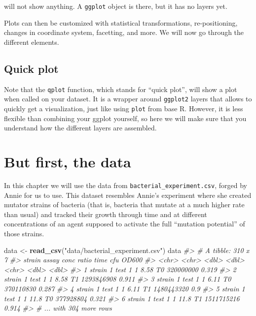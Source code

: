 \documentclass[]{book}
\newenvironment{Shaded}{}{}
\newcommand{\CommentTok}[1]{\textcolor[rgb]{0.38,0.63,0.69}{\textit{#1}}}
\newcommand{\KeywordTok}[1]{\textcolor[rgb]{0.00,0.44,0.13}{\textbf{#1}}}
\newcommand{\NormalTok}[1]{#1}
\newcommand{\StringTok}[1]{\textcolor[rgb]{0.25,0.44,0.63}{#1}}
\begin{document}
will not show anything. A \texttt{ggplot} object is there, but it has no layers yet.

Plots can then be customized with statistical transformations, re-positioning, changes in coordinate system, facetting, and more. We will now go through the different elements.

\hypertarget{quick-plot}{%
\subsection{Quick plot}\label{quick-plot}}

Note that the \texttt{qplot} function, which stands for ``quick plot'', will show a plot when called on your dataset. It is a wrapper around \texttt{ggplot2} layers that allows to quickly get a visualization, just like using \texttt{plot} from base R. However, it is less flexible than combining your ggplot yourself, so here we will make sure that you understand how the different layers are assembled.

\hypertarget{but-first-the-data}{%
\section{But first, the data}\label{but-first-the-data}}

In this chapter we will use the data from \texttt{bacterial\_experiment.csv}, forged by Annie for us to use. This dataset resembles Annie's experiment where she created mutator strains of bacteria (that is, bacteria that mutate at a much higher rate than usual) and tracked their growth through time and at different concentrations of an agent supposed to activate the full ``mutation potential'' of those strains.

\begin{Shaded}
\begin{Highlighting}[]
\NormalTok{data <-}\StringTok{ }\KeywordTok{read_csv}\NormalTok{(}\StringTok{"data/bacterial_experiment.csv"}\NormalTok{)}
\NormalTok{data}
\CommentTok{#> # A tibble: 310 x 7}
\CommentTok{#>   strain   assay   conc ratio time         cfu OD600}
\CommentTok{#>   <chr>    <chr>  <dbl> <dbl> <chr>      <dbl> <dbl>}
\CommentTok{#> 1 strain 1 test 1     1  8.58 T0     320000000 0.319}
\CommentTok{#> 2 strain 1 test 1     1  8.58 T1    1293846908 0.911}
\CommentTok{#> 3 strain 1 test 1     1  6.11 T0     370110830 0.287}
\CommentTok{#> 4 strain 1 test 1     1  6.11 T1    1480443320 0.9  }
\CommentTok{#> 5 strain 1 test 1     1 11.8  T0     377928804 0.321}
\CommentTok{#> 6 strain 1 test 1     1 11.8  T1    1511715216 0.914}
\CommentTok{#> # ... with 304 more rows}
\end{Highlighting}
\end{Shaded}
\end{document}
